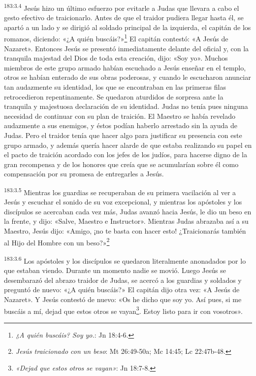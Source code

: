 \par 
\textsuperscript{183:3.4} Jesús hizo un último esfuerzo por evitarle a Judas que llevara a cabo el gesto efectivo de traicionarlo. Antes de que el traidor pudiera llegar hasta él, se apartó a un lado y se dirigió al soldado principal de la izquierda, el capitán de los romanos, diciendo: «¿A quién buscáis?»\footnote{\textit{¿A quién buscáis? Soy yo.}: Jn 18:4-6.} El capitán contestó: «A Jesús de Nazaret». Entonces Jesús se presentó inmediatamente delante del oficial y, con la tranquila majestad del Dios de toda esta creación, dijo: «Soy yo». Muchos miembros de este grupo armado habían escuchado a Jesús enseñar en el templo, otros se habían enterado de sus obras poderosas, y cuando le escucharon anunciar tan audazmente su identidad, los que se encontraban en las primeras filas retrocedieron repentinamente. Se quedaron aturdidos de sorpresa ante la tranquila y majestuosa declaración de su identidad. Judas no tenía pues ninguna necesidad de continuar con su plan de traición. El Maestro se había revelado audazmente a sus enemigos, y éstos podían haberlo arrestado sin la ayuda de Judas. Pero el traidor tenía que hacer algo para justificar su presencia con este grupo armado, y además quería hacer alarde de que estaba realizando su papel en el pacto de traición acordado con los jefes de los judíos, para hacerse digno de la gran recompensa y de los honores que creía que se acumularían sobre él como compensación por su promesa de entregarles a Jesús.

\par 
\textsuperscript{183:3.5} Mientras los guardias se recuperaban de su primera vacilación al ver a Jesús y escuchar el sonido de su voz excepcional, y mientras los apóstoles y los discípulos se acercaban cada vez más, Judas avanzó hacia Jesús, le dio un beso en la frente, y dijo: «Salve, Maestro e Instructor». Mientras Judas abrazaba así a su Maestro, Jesús dijo: «Amigo, ¡no te basta con hacer esto! ¿Traicionarás también al Hijo del Hombre con un beso?»\footnote{\textit{Jesús traicionado con un beso}: Mt 26:49-50a; Mc 14:45; Lc 22:47b-48.}

\par 
\textsuperscript{183:3.6} Los apóstoles y los discípulos se quedaron literalmente anonadados por lo que estaban viendo. Durante un momento nadie se movió. Luego Jesús se desembarazó del abrazo traidor de Judas, se acercó a los guardias y soldados y preguntó de nuevo: «¿A quién buscáis?» El capitán dijo otra vez: «A Jesús de Nazaret». Y Jesús contestó de nuevo: «Os he dicho que soy yo. Así pues, si me buscáis a mí, dejad que estos otros se vayan\footnote{\textit{«Dejad que estos otros se vayan»}: Jn 18:7-8.}. Estoy listo para ir con vosotros».

